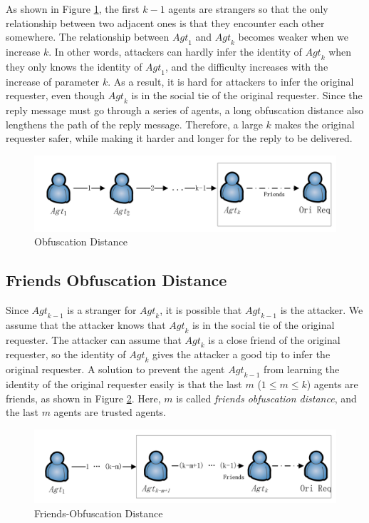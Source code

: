 As shown in Figure \ref{fig:ObfuscationDistance}, the first $k-1$ agents are strangers so that the only relationship between two adjacent ones is that they encounter each other somewhere. The relationship between ${Agt}_1$ and ${Agt}_k$ becomes weaker when we increase $k$. In other words, attackers can hardly infer the identity of ${Agt}_k$ when they only knows the identity of ${Agt}_1$, and the difficulty increases with the increase of parameter $k$. As a result, it is hard for attackers to infer the original requester, even though ${Agt}_k$ is in the social tie of the original requester. Since the reply message must go through a series of agents, a long obfuscation distance also lengthens the path of the reply message. Therefore, a large $k$ makes the original requester safer, while making it harder and longer for the reply to be delivered.

\begin{figure} [hbtp]
\centering 
\includegraphics[width=6.0in]{figures/ACPObfDis.png}
\caption{Obfuscation Distance} 
\label{fig:ObfuscationDistance} %
\end{figure}

\subsection{Friends Obfuscation Distance}

\noindent Since ${Agt}_{k-1}$ is a stranger for ${Agt}_k$, it is possible that ${Agt}_{k-1}$ is the attacker. We assume that the attacker knows that ${Agt}_k$ is in the social tie of the original requester. The attacker can assume that ${Agt}_k$ is a close friend of the original requester, so the identity of ${Agt}_k$ gives the attacker a good tip to infer the original requester. A solution to prevent the agent ${Agt}_{k-1}$ from learning the identity of the original requester easily is that the last $m$ ($1\leq m\leq k$) agents are friends, as shown in Figure \ref{fig:FriObfuscationDistance}. Here, $m$ is called \textit{friends obfuscation distance}, and the last $m$ agents are trusted agents.

\begin{figure} [hbtp]
\centering 
\includegraphics[width=6.0in]{figures/ACPFriObfDis.png}
\caption{Friends-Obfuscation Distance} 
\label{fig:FriObfuscationDistance} %
\end{figure}

